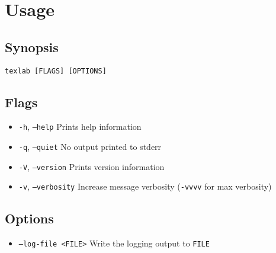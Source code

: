 \documentclass{article}
\begin{document}
\section{Usage}

\subsection{Synopsis}

\texttt{texlab [FLAGS] [OPTIONS]}

\subsection{Flags}

\begin{itemize}
    \item \texttt{-h}, \texttt{--help} Prints help information
    \item \texttt{-q}, \texttt{--quiet} No output printed to stderr
    \item \texttt{-V}, \texttt{--version} Prints version information
    \item \texttt{-v}, \texttt{--verbosity} Increase message verbosity (\texttt{-vvvv} for max verbosity)
\end{itemize}

\subsection{Options}

\begin{itemize}
    \item \texttt{--log-file <FILE>} Write the logging output to \texttt{FILE}
\end{itemize}
\end{document}
